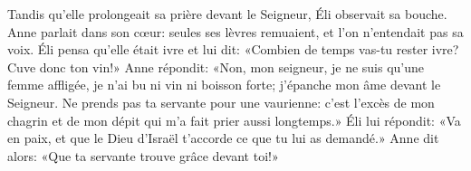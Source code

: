 Tandis qu’elle prolongeait sa prière devant le Seigneur, Éli observait sa bouche.
Anne parlait dans son cœur:
	seules ses lèvres remuaient, et l’on n’entendait pas sa voix.
Éli pensa qu’elle était ivre et lui dit:
	«Combien de temps vas-tu rester ivre?
	Cuve donc ton vin!»
Anne répondit: «Non, mon seigneur, je ne suis qu’une femme affligée,
	je n’ai bu ni vin ni boisson forte; j’épanche mon âme devant le Seigneur.
Ne prends pas ta servante pour une vaurienne:
	c’est l’excès de mon chagrin et de mon dépit qui m’a fait prier aussi longtemps.»
Éli lui répondit:
	«Va en paix, et que le Dieu d’Israël t’accorde ce que tu lui as demandé.»
Anne dit alors: «Que ta servante trouve grâce devant toi!»
